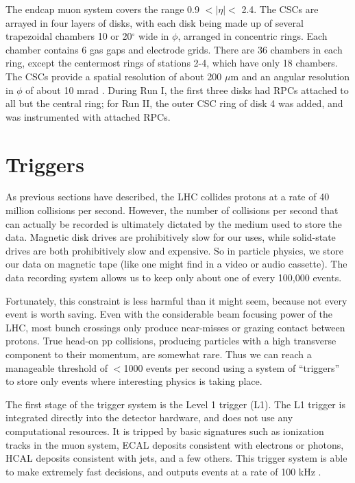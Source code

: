 The endcap muon system covers the range 0.9 $< |\eta| <$ 2.4. The
CSCs are arrayed in four layers of disks, with each disk being made up
of several trapezoidal chambers 10 or 20$^\circ$ wide in $\phi$,
arranged in concentric rings. Each chamber contains 6 gas gaps and
electrode grids. There are 36 chambers in each ring, except the
centermost rings of stations 2-4, which have only 18 chambers. The
CSCs provide a spatial resolution of about 200 $\mu$m and an angular
resolution in $\phi$ of about 10 mrad \cite{tdr}. During Run I, the
first three disks had RPCs attached to all but the central ring; for
Run II, the outer CSC ring of disk 4 was added, and was instrumented
with attached RPCs.


\section{Triggers}
\label{sec:cms:triggers}

As previous sections have described, the LHC collides protons at a
rate of 40 million collisions per second. However, the number of
collisions per second that can actually be recorded is ultimately
dictated by the medium used to store the data. Magnetic disk drives
are prohibitively slow for our uses, while solid-state
drives are both prohibitively slow and expensive. So in particle
physics, we store our data
on magnetic tape (like one might find in a video or audio
cassette). The data recording system allows us to keep only about one
of every 100,000 events.

Fortunately, this constraint is less harmful than it might seem,
because not every event is worth saving. Even with the
considerable beam focusing power of the LHC, most bunch crossings only produce
near-misses or grazing contact between protons. True head-on pp
collisions, producing particles with a high transverse component to
their momentum, are somewhat rare. Thus we can reach a manageable threshold of
$<$1000 events per second using a system of ``triggers'' to store only
events where interesting physics is taking place.

The first stage of the trigger system is the Level 1 trigger
(L1). The L1 trigger is integrated directly into the detector
hardware, and does not use any computational resources. It
is tripped by basic signatures such as ionization tracks in the muon system, ECAL
deposits consistent with electrons or photons, HCAL deposits
consistent with jets, and a few others. This trigger system is able to
make extremely fast decisions, and outputs events at a rate of 100
kHz \cite{trigger}.

